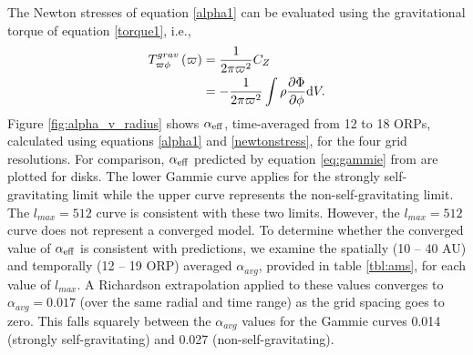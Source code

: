 \documentclass[manuscript]{aastex}
\begin{document}
The Newton stresses of equation \eqref{alpha1} can be evaluated using the gravitational torque of equation \eqref{torque1}, i.e.,
\begin{equation}
\label{newtonstress}
\begin{split}
 T_{\varpi\phi}^{grav}\left( \varpi \right) & = \frac{1}{2\pi\varpi^2}C_Z\\
                                & = - \frac{1}{2\pi\varpi^2} \int \rho\frac{\partial\Phi}{\partial\phi} {\rm d}V.
\end{split}
\end{equation}
Figure \ref{fig:alpha_v_radius} shows $\alpha_{\rm{eff}}$, time-averaged from 12 to 18 ORPs, calculated using equations \eqref{alpha1} and \eqref{newtonstress},
for the four grid resolutions.  For comparison, 
$\alpha_{\rm{eff}}$ predicted by equation \eqref{eq:gammie} from \citet{gammie2001} are plotted for disks.  The lower  Gammie curve applies for the strongly self-gravitating limit while the upper curve 
represents the non-self-gravitating limit.   The $l_{max} = 512$ curve is consistent with these two limits.  However, 
the  $l_{max} = 512$ curve does not represent a converged model.
To determine whether the converged value of $\alpha_{\rm{eff}}$ is consistent with predictions, we examine 
the spatially (10 -- 40 AU) and temporally (12 -- 19 ORP) averaged  $\alpha_{avg}$,
provided in table \ref{tbl:ams}, for each value of  $l_{max}$.    A Richardson extrapolation applied to these values  
converges to $\alpha_{avg} = 0.017$ (over the same radial  and time range)
as the grid spacing goes to zero.   This falls squarely
between the $\alpha_{avg}$ values for the Gammie curves 0.014 (strongly self-gravitating) and 0.027 (non-self-gravitating).
\end{document}
